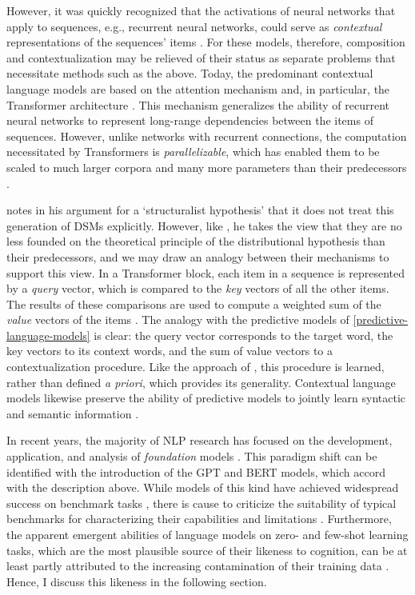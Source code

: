 However, it was quickly recognized that the activations of neural networks that apply
to sequences, e.g., recurrent neural networks, could serve as \emph{contextual}
representations of the sequences' items
\parencites{McCann2017}{Peters2017}{Peters2018}.
For these models, therefore, composition and contextualization may be relieved of their
status as separate problems that necessitate methods such as the above.
Today, the predominant contextual language models are based on the attention mechanism
\parencites[3-4]{Bahdanau2015} and, in particular, the Transformer architecture
\parencites{Vaswani2017}.
This mechanism generalizes the ability of recurrent neural networks to represent
long-range dependencies between the items of sequences.
However, unlike networks with recurrent connections, the computation necessitated by
Transformers is \emph{parallelizable}, which has enabled them to be scaled to much
larger corpora and many more parameters than their predecessors
\parencites[e.g.][]{Kaplan2020}.

\textcites[190]{Gastaldi2021} notes in his argument for a `structuralist hypothesis'
that it does not treat this generation of DSMs explicitly.
However, like \textcites[355]{Lenci2023}, he takes the view that they are no less
founded on the theoretical principle of the distributional hypothesis than their
predecessors, and we may draw an analogy between their mechanisms to support this view.
In a Transformer block, each item in a sequence is represented by a \emph{query}
vector, which is compared to the \emph{key} vectors of all the other items.
The results of these comparisons are used to compute a weighted sum of the \emph{value}
vectors of the items \parencites[3-4]{Vaswani2017}.
The analogy with the predictive models of \cref{predictive-language-models} is clear:
the query vector corresponds to the target word, the key vectors to its context words,
and the sum of value vectors to a contextualization procedure.
Like the approach of \textcites{Socher2012}, this procedure is learned, rather than
defined \emph{a priori}, which provides its generality.
Contextual language models likewise preserve the ability of predictive models to
jointly learn syntactic and semantic information \parencites[e.g.][]{Hewitt2019}.

In recent years, the majority of NLP research has focused on the development,
application, and analysis of \emph{foundation} models
\parencites[22-27]{Bommasani2022}.
This paradigm shift can be identified with the introduction of the GPT
\parencites{Radford2018}{Radford2019} and BERT \parencites{Devlin2019} models, which
accord with the description above.
While models of this kind have achieved widespread success on benchmark tasks
\parencites[22-27]{Bommasani2022}, there is cause to criticize the suitability of
typical benchmarks for characterizing their capabilities and limitations
\parencites[5-6]{Srivastava2023}.
Furthermore, the apparent emergent abilities of language models \parencites{Wei2022} on
zero- and few-shot learning tasks, which are the most plausible source of their
likeness to cognition, can be at least partly attributed to the increasing
contamination of their training data \parencites{Li2023a}.
Hence, I discuss this likeness in the following section.
